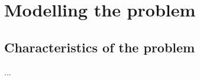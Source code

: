 \documentclass[13pt, letterpaper, twoside]{book}
\begin{document}
\chapter{Modelling the problem}
\section{Characteristics of the problem}

...









\begin{comment}
\chapter{My solution}
\section{MIP formulation improvements}
\section{CP formulation improvements}

\chapter{Discussion}


\pagebreak

\vskip 4em
\end{comment}
\end{document}
